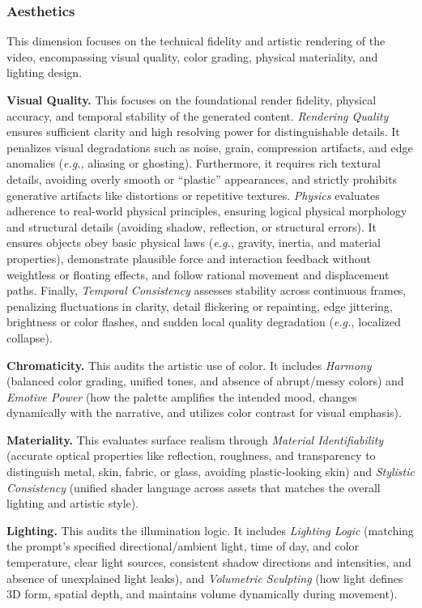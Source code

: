 \documentclass{article}
\begin{document}
\subsubsection{Aesthetics}
\noindent
This dimension focuses on the technical fidelity and artistic rendering of the video, encompassing visual quality, color grading, physical materiality, and lighting design.

\noindent
\textbf{Visual Quality.} This focuses on the foundational render fidelity, physical accuracy, and temporal stability of the generated content. \textit{Rendering Quality} ensures sufficient clarity and high resolving power for distinguishable details. It penalizes visual degradations such as noise, grain, compression artifacts, and edge anomalies (\textit{e.g.,} aliasing or ghosting). Furthermore, it requires rich textural details, avoiding overly smooth or ``plastic'' appearances, and strictly prohibits generative artifacts like distortions or repetitive textures. \textit{Physics} evaluates adherence to real-world physical principles, ensuring logical physical morphology and structural details (avoiding shadow, reflection, or structural errors). It ensures objects obey basic physical laws (\textit{e.g.,} gravity, inertia, and material properties), demonstrate plausible force and interaction feedback without weightless or floating effects, and follow rational movement and displacement paths. Finally, \textit{Temporal Consistency} assesses stability across continuous frames, penalizing fluctuations in clarity, detail flickering or repainting, edge jittering, brightness or color flashes, and sudden local quality degradation (\textit{e.g.,} localized collapse).

\noindent
\textbf{Chromaticity.} This audits the artistic use of color. It includes \textit{Harmony} (balanced color grading, unified tones, and absence of abrupt/messy colors) and \textit{Emotive Power} (how the palette amplifies the intended mood, changes dynamically with the narrative, and utilizes color contrast for visual emphasis).

\noindent
\textbf{Materiality.} This evaluates surface realism through \textit{Material Identifiability} (accurate optical properties like reflection, roughness, and transparency to distinguish metal, skin, fabric, or glass, avoiding plastic-looking skin) and \textit{Stylistic Consistency} (unified shader language across assets that matches the overall lighting and artistic style).

\noindent
\textbf{Lighting.} This audits the illumination logic. It includes \textit{Lighting Logic} (matching the prompt's specified directional/ambient light, time of day, and color temperature, clear light sources, consistent shadow directions and intensities, and absence of unexplained light leaks), and \textit{Volumetric Sculpting} (how light defines 3D form, spatial depth, and maintains volume dynamically during movement).
\end{document}

